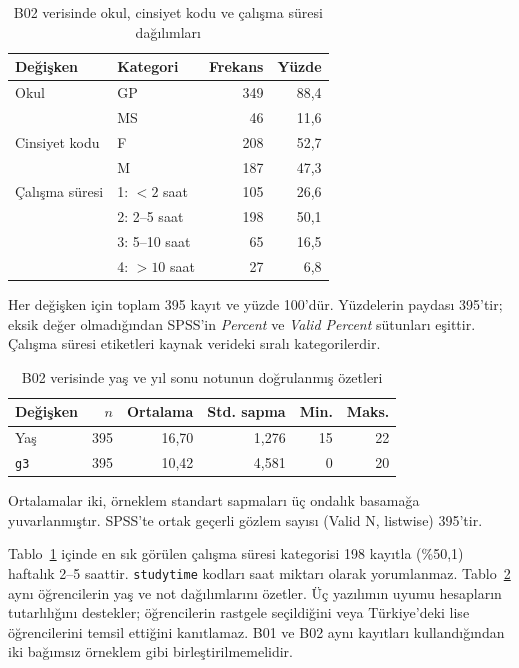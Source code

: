 \begin{table}[htbp]
\centering
\caption{B02 verisinde okul, cinsiyet kodu ve çalışma süresi dağılımları}
\label{tab:b02-dogrulanmis-frekans}
\small
\begin{tabular}{@{}llrr@{}}
\toprule
Değişken & Kategori & Frekans & Yüzde \\
\midrule
Okul & GP & 349 & 88,4 \\
     & MS & 46 & 11,6 \\
\midrule
Cinsiyet kodu & F & 208 & 52,7 \\
              & M & 187 & 47,3 \\
\midrule
Çalışma süresi & 1: $<2$ saat & 105 & 26,6 \\
              & 2: 2--5 saat & 198 & 50,1 \\
              & 3: 5--10 saat & 65 & 16,5 \\
              & 4: $>10$ saat & 27 & 6,8 \\
\bottomrule
\end{tabular}
\par\smallskip
{\footnotesize Her değişken için toplam 395 kayıt ve yüzde 100'dür.
Yüzdelerin paydası 395'tir; eksik değer olmadığından SPSS'in
\emph{Percent} ve \emph{Valid Percent} sütunları eşittir.
Çalışma süresi etiketleri kaynak verideki sıralı kategorilerdir.\par}
\end{table}

\begin{table}[htbp]
\centering
\caption{B02 verisinde yaş ve yıl sonu notunun doğrulanmış özetleri}
\label{tab:b02-dogrulanmis-betimsel}
\small
\begin{tabular}{@{}lrrrrr@{}}
\toprule
Değişken & $n$ & Ortalama & Std. sapma & Min. & Maks. \\
\midrule
Yaş & 395 & 16,70 & 1,276 & 15 & 22 \\
\texttt{g3} & 395 & 10,42 & 4,581 & 0 & 20 \\
\bottomrule
\end{tabular}
\par\smallskip
{\footnotesize Ortalamalar iki, örneklem standart sapmaları üç ondalık
basamağa yuvarlanmıştır. SPSS'te ortak geçerli gözlem sayısı
(Valid N, listwise) 395'tir.\par}
\end{table}

\begin{outputguidebox}
Tablo~\ref{tab:b02-dogrulanmis-frekans} içinde en sık görülen çalışma
süresi kategorisi 198 kayıtla (\%50,1) haftalık 2--5 saattir.
\texttt{studytime} kodları saat miktarı olarak yorumlanmaz.
Tablo~\ref{tab:b02-dogrulanmis-betimsel} aynı öğrencilerin yaş ve not
dağılımlarını özetler. Üç yazılımın uyumu hesapların tutarlılığını
destekler; öğrencilerin rastgele seçildiğini veya Türkiye'deki lise
öğrencilerini temsil ettiğini kanıtlamaz. B01 ve B02 aynı kayıtları
kullandığından iki bağımsız örneklem gibi birleştirilmemelidir.
\end{outputguidebox}

